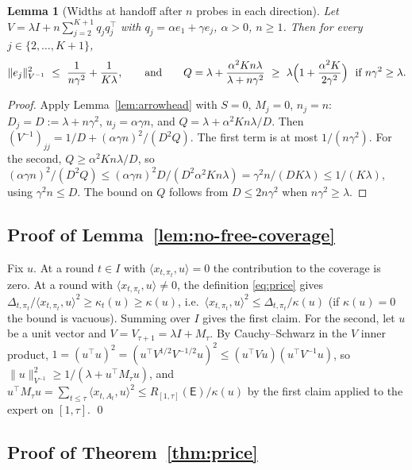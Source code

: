 \documentclass{article}
\newtheorem{lemma}{Lemma}
\theoremstyle{definition}
\theoremstyle{remark}
\theoremstyle{remark}
\newcommand{\Exp}{\mathsf{E}}
\begin{document}
\begin{lemma}[Widths at handoff after $n$ probes in each direction]
\label{lem:cat-handoff}
Let $V=\lambda I+n\sum_{j=2}^{K+1}q_jq_j^\top$ with $q_j=\alpha e_1+\gamma e_j$, $\alpha>0$,
$n\ge1$. Then for every $j\in\{2,\dots,K+1\}$,
\[
\|e_j\|^2_{V^{-1}}\ \le\ \frac1{n\gamma^2}+\frac1{K\lambda},
\qquad\text{and}\qquad
Q=\lambda+\frac{\alpha^2Kn\lambda}{\lambda+n\gamma^2}\ \ge\ \lambda\Bigl(1+\frac{\alpha^2K}{2\gamma^2}\Bigr)\ \text{ if } n\gamma^2\ge\lambda .
\]
\end{lemma}

\begin{proof}
Apply Lemma~\ref{lem:arrowhead} with $S=0$, $M_j=0$, $n_j=n$: $D_j=D:=\lambda+n\gamma^2$,
$u_j=\alpha \gamma n$, and $Q=\lambda+\alpha^2Kn\lambda/D$. Then
$(V^{-1})_{jj}=1/D+(\alpha \gamma n)^2/(D^2Q)$. The first term is at most $1/(n\gamma^2)$.
For the second, $Q\ge\alpha^2Kn\lambda/D$, so
$(\alpha \gamma n)^2/(D^2Q)\le(\alpha \gamma n)^2D/(D^2\alpha^2Kn\lambda)=\gamma^2n/(DK\lambda)\le1/(K\lambda)$,
using $\gamma^2n\le D$. The bound on $Q$ follows from $D\le2n\gamma^2$ when $n\gamma^2\ge\lambda$.
\end{proof}

\subsection{Proof of Lemma~\ref{lem:no-free-coverage}}

Fix $u$. At a round $t\in I$ with $\langle x_{t,\pi_t},u\rangle=0$ the
contribution to the coverage is zero. At a round with
$\langle x_{t,\pi_t},u\rangle\ne0$, the definition \eqref{eq:price} gives
$\Delta_{t,\pi_t}/\langle x_{t,\pi_t},u\rangle^2\ge\kappa_t(u)\ge\kappa(u)$, i.e.\
$\langle x_{t,\pi_t},u\rangle^2\le\Delta_{t,\pi_t}/\kappa(u)$ (if $\kappa(u)=0$ the bound
is vacuous). Summing over $I$ gives the first claim. For the second, let
$u$ be a unit vector and $V=V_{\tau+1}=\lambda I+M_\tau$. By Cauchy--Schwarz in
the $V$ inner product,
$1=(u^\top u)^2=(u^\top V^{1/2}V^{-1/2}u)^2\le(u^\top Vu)(u^\top V^{-1}u)$, so
$\|u\|^2_{V^{-1}}\ge1/(\lambda+u^\top M_\tau u)$, and
$u^\top M_\tau u=\sum_{t\le\tau}\langle x_{t,A_t},u\rangle^2\le R_{[1,\tau]}(\Exp)/\kappa(u)$
by the first claim applied to the expert on $[1,\tau]$. \qed

\subsection{Proof of Theorem~\ref{thm:price}}
\end{document}
